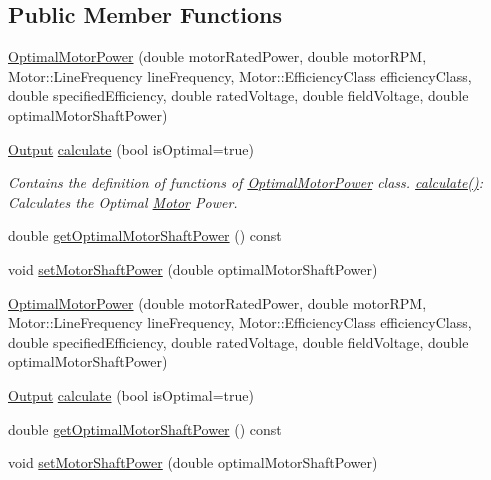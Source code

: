 \subsection*{Public Member Functions}
\begin{DoxyCompactItemize}
\item 
\hyperlink{class_optimal_motor_power_a36017bbd359437ce77c1e18dc2377961}{Optimal\+Motor\+Power} (double motor\+Rated\+Power, double motor\+R\+PM, Motor\+::\+Line\+Frequency line\+Frequency, Motor\+::\+Efficiency\+Class efficiency\+Class, double specified\+Efficiency, double rated\+Voltage, double field\+Voltage, double optimal\+Motor\+Shaft\+Power)
\item 
\hyperlink{struct_optimal_motor_power_1_1_output}{Output} \hyperlink{class_optimal_motor_power_accca3d8da33259697ceeb48f9c2a4547}{calculate} (bool is\+Optimal=true)
\begin{DoxyCompactList}\small\item\em Contains the definition of functions of \hyperlink{class_optimal_motor_power}{Optimal\+Motor\+Power} class. \hyperlink{class_optimal_motor_power_accca3d8da33259697ceeb48f9c2a4547}{calculate()}\+: Calculates the Optimal \hyperlink{struct_motor}{Motor} Power. \end{DoxyCompactList}\item 
double \hyperlink{class_optimal_motor_power_a7d6e976abf406c54637d3b51e098d7c8}{get\+Optimal\+Motor\+Shaft\+Power} () const
\item 
void \hyperlink{class_optimal_motor_power_ada8a9e3caac34c54470ad13ffe7edf53}{set\+Motor\+Shaft\+Power} (double optimal\+Motor\+Shaft\+Power)
\item 
\hyperlink{class_optimal_motor_power_a36017bbd359437ce77c1e18dc2377961}{Optimal\+Motor\+Power} (double motor\+Rated\+Power, double motor\+R\+PM, Motor\+::\+Line\+Frequency line\+Frequency, Motor\+::\+Efficiency\+Class efficiency\+Class, double specified\+Efficiency, double rated\+Voltage, double field\+Voltage, double optimal\+Motor\+Shaft\+Power)
\item 
\hyperlink{struct_optimal_motor_power_1_1_output}{Output} \hyperlink{class_optimal_motor_power_a8c33958584d48ee046fcd4d56258c3e2}{calculate} (bool is\+Optimal=true)
\item 
double \hyperlink{class_optimal_motor_power_a7d6e976abf406c54637d3b51e098d7c8}{get\+Optimal\+Motor\+Shaft\+Power} () const
\item 
void \hyperlink{class_optimal_motor_power_ada8a9e3caac34c54470ad13ffe7edf53}{set\+Motor\+Shaft\+Power} (double optimal\+Motor\+Shaft\+Power)

\end{DoxyCompactItemize}
